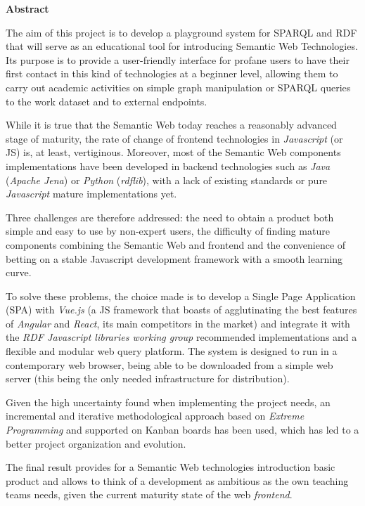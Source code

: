 %
\noindent \begin{center}
\textbf{\Large{}Abstract}
\par\end{center}{\Large \par}

\noindent \thispagestyle{empty}

The aim of this project is to develop a playground system for SPARQL and RDF that will serve as an educational tool for introducing Semantic Web Technologies. Its purpose is to provide a user-friendly interface for profane users to have their first contact in this kind of technologies at a beginner level, allowing them to carry out academic activities on simple graph manipulation or SPARQL queries to the work dataset and to external endpoints.

While it is true that the Semantic Web today reaches a reasonably advanced stage of maturity, the rate of change of frontend technologies in \textit{Javascript} (or JS) is, at least, vertiginous. Moreover, most of the Semantic Web components implementations have been developed in backend technologies such as \textit{Java} (\textit{Apache Jena}) or \textit{Python} (\textit{rdflib}), with a lack of existing standards or pure \textit{Javascript} mature implementations yet.

Three challenges are therefore addressed: the need to obtain a product both simple and easy to use by non-expert users, the difficulty of finding mature components combining the Semantic Web and frontend and the convenience of betting on a stable Javascript development framework with a smooth learning curve.

To solve these problems, the choice made is to develop a Single Page Application (SPA) with \textit{Vue.js} (a JS framework that boasts of agglutinating the best features of \textit {Angular} and \textit {React}, its main competitors in the market) and integrate it with the \textit{RDF Javascript libraries working group} recommended implementations and a flexible and modular web query platform. The system is designed to run in a contemporary web browser, being able to be downloaded from a simple web server (this being the only needed infrastructure for distribution).

Given the high uncertainty found when implementing the project needs, an incremental and iterative methodological approach based on \textit {Extreme Programming} and supported on Kanban boards has been used, which has led to a better project organization and evolution.

The final result provides for a Semantic Web technologies introduction basic product and allows to think of a development as ambitious as the own teaching teams needs, given the current maturity state of the web \textit {frontend}.

%

